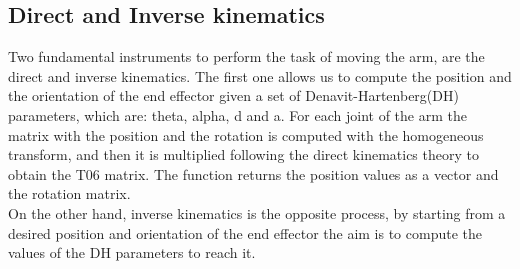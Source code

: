 \documentclass[12pt,a4paper]{article}
\begin{document}
\subsection{Direct and Inverse kinematics}\label{subsec:kinematics}
Two fundamental instruments to perform the task of moving the arm, are the direct and inverse kinematics. The first one allows us to compute the position and the orientation of the end effector given a set of Denavit-Hartenberg(DH) parameters, which are: theta, alpha, d and a. For each joint of the arm the matrix with the position and the rotation is computed with the homogeneous transform, and then it is multiplied following the direct kinematics theory to obtain the T06 matrix. The function returns the position values as a vector and the rotation matrix.\\
On the other hand, inverse kinematics is the opposite process, by starting from a desired position and orientation of the end effector the aim is to compute the values of the DH parameters to reach it.
\end{document}
